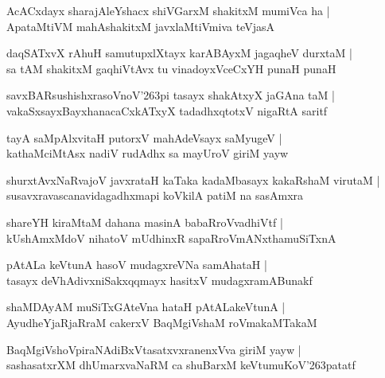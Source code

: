 \documentclass[twoside,12pt,openright]{book}
\def\S{\char'263}
\newcounter{shloka}[chapter]
\begin{document}
\begin{shloka}%
AcACxdayx sharajAleYshacx shiVGarxM shakitxM mumiVca ha |\\
ApataMtiVM mahAshakitxM javxlaMtiVmiva teVjasA
\end{shloka}

\begin{shloka}%
daqSATxvX rAhuH samutupxlXtayx karABAyxM jagaqheV durxtaM |\\
sa tAM shakitxM gaqhiVtAvx tu vinadoyxVceCxYH punaH punaH 
\end{shloka}

\begin{shloka}%
savxBARsushishxrasoVnoV\S pi tasayx shakAtxyX jaGAna taM |\\
vakaSxsayxBayxhanacaCxkATxyX tadadhxqtotxV nigaRtA saritf 
\end{shloka}

\begin{shloka}%
tayA saMpAlxvitaH putorxV mahAdeVsayx saMyugeV |\\
kathaMciMtAsx nadiV rudAdhx sa mayUroV giriM yayw 
\end{shloka}

\begin{shloka}%
shurxtAvxNaRvajoV javxrataH kaTaka kadaMbasayx kakaRshaM virutaM |\\
susavxravascanavidagadhxmapi koVkilA patiM na sasAmxra
\end{shloka}

\begin{shloka}%
shareYH kiraMtaM dahana masinA babaRroVvadhiVtf |\\
kUshAmxMdoV nihatoV mUdhinxR sapaRroVmANxthamuSiTxnA 
\end{shloka}

\begin{shloka}%
pAtALa keVtunA hasoV mudagxreVNa samAhataH |\\
tasayx deVhAdivxniSakxqqmayx hasitxV mudagxramABunakf 
\end{shloka}

\begin{shloka}%
shaMDAyAM muSiTxGAteVna hataH pAtALakeVtunA |\\
AyudheYjaRjaRraM cakerxV BaqMgiVshaM roVmakaMTakaM 
\end{shloka}

\begin{shloka}%
BaqMgiVshoVpiraNAdiBxVtasatxvxranenxVva giriM yayw |\\
sashasatxrXM dhUmarxvaNaRM ca shuBarxM keVtumuKoV\S patatf 
\end{shloka}
\end{document}
